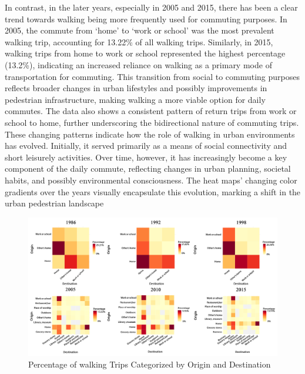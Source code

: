 \documentclass[
11pt, %
oneside, %
english, %
singlespacing, %
]{macthesis} %
\begin{document}
In contrast, in the later years, especially in 2005 and 2015, there has been a clear trend towards walking being more frequently used for commuting purposes. In 2005, the commute from `home' to `work or school' was the most prevalent walking trip, accounting for 13.22\% of all walking trips. Similarly, in 2015, walking trips from home to work or school represented the highest percentage (13.2\%), indicating an increased reliance on walking as a primary mode of transportation for commuting. This transition from social to commuting purposes reflects broader changes in urban lifestyles and possibly improvements in pedestrian infrastructure, making walking a more viable option for daily commutes. The data also shows a consistent pattern of return trips from work or school to home, further underscoring the bidirectional nature of commuting trips.
These changing patterns indicate how the role of walking in urban environments has evolved. Initially, it served primarily as a means of social connectivity and short leisurely activities. Over time, however, it has increasingly become a key component of the daily commute, reflecting changes in urban planning, societal habits, and possibly environmental consciousness. The heat maps' changing color gradients over the years visually encapsulate this evolution, marking a shift in the urban pedestrian landscape

\clearpage
\newpage
\thispagestyle{empty}
\begin{landscape}

\begin{figure}

{\centering \includegraphics[width=1\linewidth]{figure/ch03-Fig01} 

}

\caption{Percentage of walking Trips Categorized by Origin and Destination}\label{fig:heat-w}
\end{figure}
\end{landscape}
\clearpage
\end{document}
